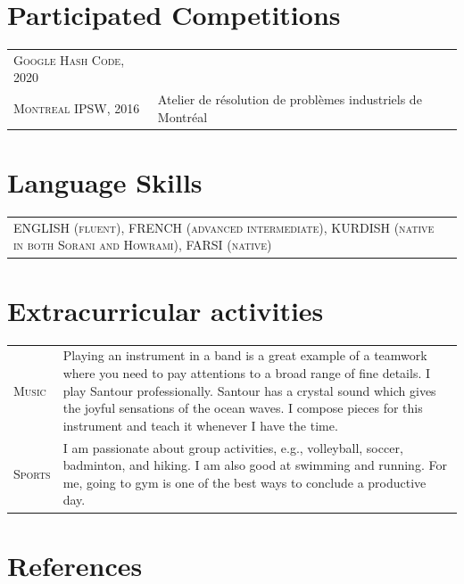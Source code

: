 \documentclass[10PT,letter]{article}
\newcommand{\numbox}[1]{} %
\begin{document}
\section*{\numbox{9}\bfseries\textcolor{titlecol}{\sffamily Participated Competitions}}
	\begin{tabular}{p{1.7in}p{5.55in}}
	\textsc{Google Hash Code, 2020} &    \\[.5mm]
	\textsc{Montreal IPSW, 2016} &  Atelier de résolution de problèmes industriels de Montréal 
	\\[.5mm]
\end{tabular}


\section*{\numbox{9}\bfseries\textcolor{titlecol}{\sffamily Language Skills}}

	\begin{tabular}{p{7.2in}p{5.55in}}
		\textsc{ENGLISH (fluent),   FRENCH (advanced intermediate),  KURDISH (native in both Sorani and Howrami), FARSI (native)} & \\[.5mm]
	\end{tabular}

\section*{\numbox{9}\bfseries\textcolor{titlecol}{\sffamily Extracurricular activities}}

	\begin{tabular}{p{1.2in}p{5.55in}}
		\textsc{Music} & Playing an instrument in a band is a great example of a teamwork where you need to pay attentions to a broad range of fine details.   I play Santour professionally. Santour has a crystal sound which gives the joyful sensations of  the ocean waves.  I compose pieces for this instrument and teach it whenever I have the time. \\[.5mm]
		\textsc{Sports} & I am passionate about group activities, e.g., volleyball, soccer, badminton, and hiking. I am also good at swimming and running. For me, going to gym is one of the best ways to conclude a productive day. \\[.5mm]
	\end{tabular}
\section*{\numbox{9}\bfseries\textcolor{titlecol}{\sffamily References}}
\end{document}
